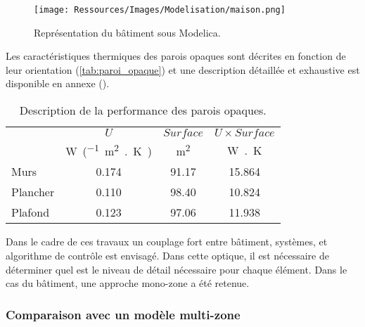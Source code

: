 \begin{figure}
    \begin{center}
        \texttt{[image: Ressources/Images/Modelisation/maison.png]}
    \end{center}
    \caption{Représentation du bâtiment sous Modelica.
             \label{fig:modelisation_maison}}
\end{figure}

Les caractéristiques thermiques des parois opaques sont décrites en fonction de
leur orientation (\autoref{tab:paroi_opaque}) et une description détaillée et exhaustive est
disponible en annexe ().
\begin{table}
\centering
\begin{tabular}{l*{3}{c}}
    \toprule
               & $U$                                       & $Surface$             & $U \times Surface$     \\
               & \si{\watt\per(\meter\squared{.}\kelvin)} & \si{\meter\squared}    & \si{\watt{.}\kelvin}  \\
    \midrule
    Murs       & 0.174                                     & 91.17                 & 15.864                 \\
    Plancher   & 0.110                                     & 98.40                 & 10.824                 \\
    Plafond    & 0.123                                     & 97.06                 & 11.938                 \\
    \bottomrule
\end{tabular}
\caption{Description de la performance des parois opaques.}
         \label{tab:paroi_opaque}
\end{table}


Dans le cadre de ces travaux un couplage fort entre bâtiment, systèmes, et algorithme
de contrôle est envisagé. Dans cette optique, il est nécessaire de déterminer quel
est le niveau de détail nécessaire pour chaque élément. Dans le cas du bâtiment, une
approche mono-zone a été retenue.


\subsubsection{Comparaison avec un modèle multi-zone} %
\label{ssub:comparaison_avec_un_modele_multi_zone}

